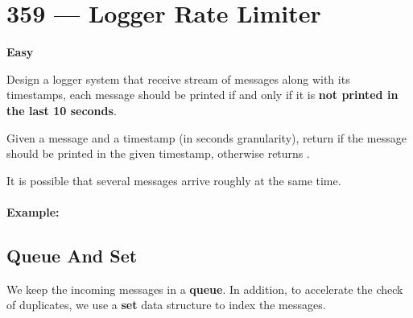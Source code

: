 \section{359 --- Logger Rate Limiter}

\textbf{Easy}

Design a logger system that receive stream of messages along with its timestamps, each message should be printed if and only if it is \textbf{not printed in the last 10 seconds}.

Given a message and a timestamp (in seconds granularity), return  if the message should be printed in the given timestamp, otherwise returns .

It is possible that several messages arrive roughly at the same time.

\paragraph{Example:}

\begin{flushleft}












\end{flushleft}

\subsection{Queue And Set}
We keep the incoming messages in a \textbf{queue}. In addition, to accelerate the check of duplicates, we use a \textbf{set} data structure to index the messages.


